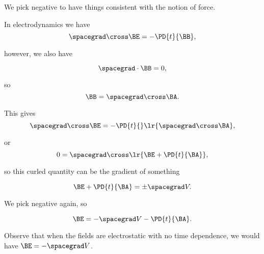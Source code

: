 We pick negative to have things consistent with the notion of force.

In electrodynamics we have
\begin{dmath}\label{eqn:emtLecture10:760}
\spacegrad \cross \BE = - \PD{t}{\BB},
\end{dmath}

however, we also have

\begin{dmath}\label{eqn:emtLecture10:780}
\spacegrad \cdot \BB = 0,
\end{dmath}

so
\begin{dmath}\label{eqn:emtLecture10:800}
   \BB = \spacegrad \cross \BA.
\end{dmath}

This gives
\begin{dmath}\label{eqn:emtLecture10:820}
   \spacegrad \cross \BE = - \PD{t}{} \lr{ \spacegrad \cross \BA },
\end{dmath}

or
\begin{dmath}\label{eqn:emtLecture10:840}
0 = 
\spacegrad \cross \lr{ \BE + \PD{t}{\BA} },
\end{dmath}

so this curled quantity can be the gradient of something

\begin{dmath}\label{eqn:emtLecture10:860}
\BE + \PD{t}{\BA} = \pm \spacegrad V.
\end{dmath}

We pick negative again, so

\begin{dmath}\label{eqn:emtLecture10:880}
\BE = -\spacegrad V -\PD{t}{\BA}.
\end{dmath}

Observe that when the fields are electrostatic with no time dependence, we would have \( \BE = -\spacegrad V \).


\EndNoBibArticle
